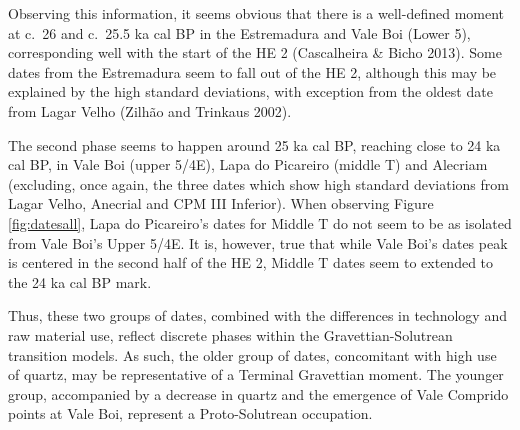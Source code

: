 \documentclass[12pt,twoside]{reedthesis}
\begin{document}
Observing this information, it seems obvious that there is a well-defined moment at c.~26 and c.~25.5 ka cal BP in the Estremadura and Vale Boi (Lower 5), corresponding well with the start of the HE 2 (Cascalheira \& Bicho 2013). Some dates from the Estremadura seem to fall out of the HE 2, although this may be explained by the high standard deviations, with exception from the oldest date from Lagar Velho (Zilhão and Trinkaus 2002).

The second phase seems to happen around 25 ka cal BP, reaching close to 24 ka cal BP, in Vale Boi (upper 5/4E), Lapa do Picareiro (middle T) and Alecriam (excluding, once again, the three dates which show high standard deviations from Lagar Velho, Anecrial and CPM III Inferior). When observing Figure \ref{fig:datesall}, Lapa do Picareiro's dates for Middle T do not seem to be as isolated from Vale Boi's Upper 5/4E. It is, however, true that while Vale Boi's dates peak is centered in the second half of the HE 2, Middle T dates seem to extended to the 24 ka cal BP mark.

Thus, these two groups of dates, combined with the differences in technology and raw material use, reflect discrete phases within the Gravettian-Solutrean transition models. As such, the older group of dates, concomitant with high use of quartz, may be representative of a Terminal Gravettian moment. The younger group, accompanied by a decrease in quartz and the emergence of Vale Comprido points at Vale Boi, represent a Proto-Solutrean occupation.
\end{document}

